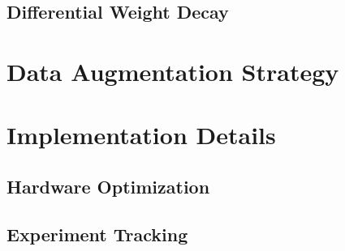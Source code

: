 \subsection{Differential Weight Decay}

\section{Data Augmentation Strategy}

\section{Implementation Details}

\subsection{Hardware Optimization}

\subsection{Experiment Tracking}

